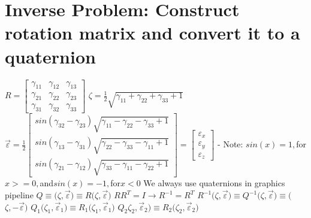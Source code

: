 \documentclass{article}
\begin{document}
\section{Inverse Problem: Construct rotation matrix and convert it to a quaternion}
$R = 
\begin{bmatrix}
\gamma_{11} & \gamma_{12} & \gamma_{13} \\
\gamma_{21} & \gamma_{22} & \gamma_{23} \\
\gamma_{31} & \gamma_{32} & \gamma_{33} 
\end{bmatrix}$
\newline
\newline
$\zeta = \frac{1}{2}\sqrt{\gamma_{11} + \gamma_{22} + \gamma_{33} +1}$
\newline
\newline
$\vec{\varepsilon} = \frac{1}{2} 
\begin{bmatrix}
sin(\gamma_{32}-\gamma_{23})\sqrt{\gamma_{11} - \gamma_{22} - \gamma_{33} +1} \\
sin(\gamma_{13}-\gamma_{31})\sqrt{\gamma_{22} - \gamma_{33} - \gamma_{11} +1} \\ sin(\gamma_{21}-\gamma_{12})\sqrt{\gamma_{33} - \gamma_{11} - \gamma_{22} +1}
\end{bmatrix} = 
\begin{bmatrix}
\varepsilon_x \\
\varepsilon_y \\
\varepsilon_z
\end{bmatrix}$
\newline
- Note: $sin(x) = 1, $\space for\space$ x >= 0, $\space and\space$ sin(x) = -1, $\space for\space$ x < 0 $
\newline
\newline
We always use quaternions in graphics pipeline
\newline
\newline
$Q \equiv ($\space$\zeta, \vec{\varepsilon}$\space$) \equiv R($\space$\zeta, \vec{\varepsilon}$\space$)$
\newline
$RR^T = I \rightarrow R^{-1} = R^T$
\newline
$R^{-1}($\space$\zeta, \vec{\varepsilon}$\space$) \equiv Q^{-1}($\space$\zeta, \vec{\varepsilon}$\space$) \equiv ($\space$\zeta, -\vec{\varepsilon}$\space$)$
\newline
\newline
$Q_1($\space$\zeta_1, \vec{\varepsilon}_1) \equiv R_1($\space$\zeta_1, \vec{\varepsilon}_1$\space$)$
\newline
$Q_2$\space$\zeta_2, \vec{\varepsilon}_2) \equiv R_2($\space$\zeta_2, \vec{\varepsilon}_2$\space$)$
\end{document}
